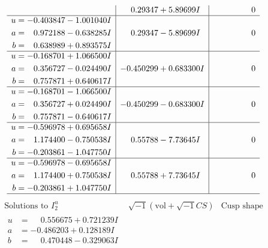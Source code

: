 \documentclass[1p]{elsarticle_modified}
\theoremstyle{definition}
\newcommand{\I}{\sqrt{-1}}
\begin{document}
$$\begin{array}{c|c|c}
 & \phantom{-}0.29347 + 5.89699 I & \phantom{-0.000000 } 0 \\ \hline\begin{aligned}
u &= -0.403847 - 1.001040 I \\
a &= \phantom{-}0.972188 - 0.638285 I \\
b &= \phantom{-}0.638989 + 0.893575 I\end{aligned}
 & \phantom{-}0.29347 - 5.89699 I & \phantom{-0.000000 } 0 \\ \hline\begin{aligned}
u &= -0.168701 + 1.066500 I \\
a &= \phantom{-}0.356727 - 0.024490 I \\
b &= \phantom{-}0.757871 + 0.640617 I\end{aligned}
 & -0.450299 + 0.683300 I & \phantom{-0.000000 } 0 \\ \hline\begin{aligned}
u &= -0.168701 - 1.066500 I \\
a &= \phantom{-}0.356727 + 0.024490 I \\
b &= \phantom{-}0.757871 - 0.640617 I\end{aligned}
 & -0.450299 - 0.683300 I & \phantom{-0.000000 } 0 \\ \hline\begin{aligned}
u &= -0.596978 + 0.695658 I \\
a &= \phantom{-}1.174400 - 0.750538 I \\
b &= -0.203861 - 1.047750 I\end{aligned}
 & \phantom{-}0.55788 - 7.73645 I & \phantom{-0.000000 } 0 \\ \hline\begin{aligned}
u &= -0.596978 - 0.695658 I \\
a &= \phantom{-}1.174400 + 0.750538 I \\
b &= -0.203861 + 1.047750 I\end{aligned}
 & \phantom{-}0.55788 + 7.73645 I & \phantom{-0.000000 } 0\\
 \hline 
 \end{array}$$\newpage$$\begin{array}{c|c|c}  
\text{Solutions to }I^u_{2}& \I (\text{vol} + \sqrt{-1}CS) & \text{Cusp shape}\\
 \hline 
\begin{aligned}
u &= \phantom{-}0.556675 + 0.721239 I \\
a &= -0.486203 + 0.128189 I \\
b &= \phantom{-}0.470448 - 0.329063 I\end{aligned}

\end{array}$$
\end{document}

